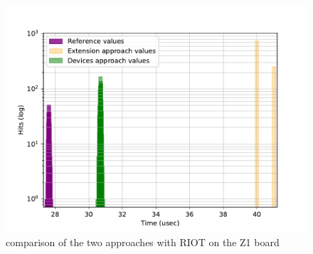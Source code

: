 \begin{figure}[!ht]
  \centering
  \includegraphics[scale=.7]{assets/comparison-all-riot-z1.pdf}
  \caption{comparison of the two approaches with RIOT on the Z1 board}\label{fig:comparison-all-riot-z1}
\end{figure}